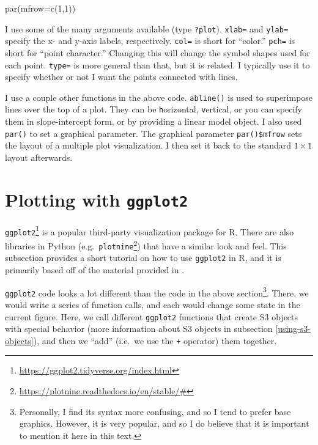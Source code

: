 \documentclass[
  12pt,
  krantz2]{krantz}
\makeatletter
\newenvironment{Shaded}{\begin{snugshade}}{\end{snugshade}}
\newcommand{\AttributeTok}[1]{\textcolor[rgb]{0.61,0.61,0.61}{#1}}
\newcommand{\DecValTok}[1]{\textcolor[rgb]{0.06,0.06,0.06}{#1}}
\newcommand{\FunctionTok}[1]{\textcolor[rgb]{0,0,0}{#1}}
\newcommand{\NormalTok}[1]{#1}
\renewcommand{\href}[2]{#2\footnote{\url{#1}}}
\newenvironment{kframe}{%
\medskip{}
\setlength{\fboxsep}{.8em}
 \def\at@end@of@kframe{}%
 \ifinner\ifhmode%
  \def\at@end@of@kframe{\end{minipage}}%
  \begin{minipage}{\columnwidth}%
 \fi\fi%
 \def\FrameCommand##1{\hskip\@totalleftmargin \hskip-\fboxsep
 \colorbox{shadecolor}{##1}\hskip-\fboxsep
     \hskip-\linewidth \hskip-\@totalleftmargin \hskip\columnwidth}%
 \MakeFramed {\advance\hsize-\width
   \@totalleftmargin\z@ \linewidth\hsize
   \@setminipage}}%
 {\par\unskip\endMakeFramed%
 \at@end@of@kframe}
\renewenvironment{Shaded}{\begin{kframe}}{\end{kframe}}
\makeatother
\begin{document}
\begin{Shaded}
\begin{Highlighting}[]
\FunctionTok{par}\NormalTok{(}\AttributeTok{mfrow=}\FunctionTok{c}\NormalTok{(}\DecValTok{1}\NormalTok{,}\DecValTok{1}\NormalTok{))}
\end{Highlighting}
\end{Shaded}

I use some of the many arguments available (type \texttt{?plot}). \texttt{xlab=} and \texttt{ylab=} specify the x- and y-axis labels, respectively. \texttt{col=} is short for ``color.'' \texttt{pch=} is short for ``point character.'' Changing this will change the symbol shapes used for each point. \texttt{type=} is more general than that, but it is related. I typically use it to specify whether or not I want the points connected with lines.

I use a couple other functions in the above code. \texttt{abline()} is used to superimpose lines over the top of a plot. They can be \texttt{h}orizontal, \texttt{v}ertical, or you can specify them in slope-intercept form, or by providing a linear model object. I also used \texttt{par()} to set a graphical parameter. The graphical parameter \texttt{par()\$mfrow} sets the layout of a multiple plot visualization. I then set it back to the standard \(1 \times 1\) layout afterwards.

\hypertarget{plotting-with-ggplot2}{%
\section{\texorpdfstring{Plotting with \texttt{ggplot2}}{Plotting with ggplot2}}\label{plotting-with-ggplot2}}

\href{https://ggplot2.tidyverse.org/index.html}{\texttt{ggplot2}} is a popular third-party visualization package for R. There are also libraries in Python (e.g.~\href{https://plotnine.readthedocs.io/en/stable/\#}{\texttt{plotnine}}) that have a similar look and feel. This subsection provides a short tutorial on how to use \texttt{ggplot2} in R, and it is primarily based off of the material provided in \citep{ggplot2}.

\texttt{ggplot2} code looks a lot different than the code in the above section\footnote{Personally, I find its syntax more confusing, and so I tend to prefer base graphics. However, it is very popular, and so I do believe that it is important to mention it here in this text.}. There, we would write a series of function calls, and each would change some state in the current figure. Here, we call different \texttt{ggplot2} functions that create S3 objects with special behavior (more information about S3 objects in subsection \ref{using-s3-objects}), and then we ``add'' (i.e.~we use the \texttt{+} operator) them together.
\end{document}
